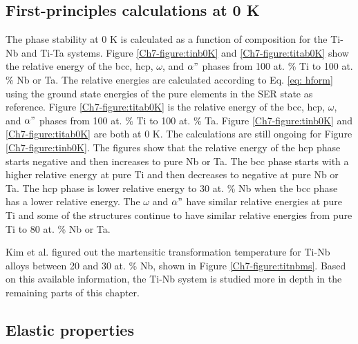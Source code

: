 \subsection{First-principles calculations at 0 K}

The phase stability at 0 K is calculated as a function of composition for the Ti-Nb and Ti-Ta systems. Figure \ref{Ch7-figure:tinb0K} and \ref{Ch7-figure:titab0K} show the relative energy of the bcc, hcp, $\omega$, and $\alpha"$ phases from 100 at. \% Ti to 100 at. \% Nb or Ta. The relative energies are calculated according to Eq. \ref{eq: hform} using the ground state energies of the pure elements in the SER state as reference. Figure \ref{Ch7-figure:titab0K} is the relative energy of the bcc, hcp, $\omega$, and $\alpha"$ phases from 100 at. \% Ti to 100 at. \% Ta. Figure \ref{Ch7-figure:tinb0K} and \ref{Ch7-figure:titab0K} are both at 0 K. The calculations are still ongoing for Figure \ref{Ch7-figure:tinb0K}. The figures show that the relative energy of the hcp phase starts negative and then increases to pure Nb or Ta. The bcc phase starts with a higher relative energy at pure Ti and then decreases to negative at pure Nb or Ta. The hcp phase is lower relative energy to 30 at. \% Nb when the bcc phase has a lower relative energy. The $\omega$ and $\alpha"$ have similar relative energies at pure Ti and some of the structures continue to have similar relative energies from pure Ti to 80 at. \% Nb or Ta.

Kim et al.  \cite{Kim2006} figured out the martensitic transformation temperature for Ti-Nb alloys between 20 and 30 at. \% Nb, shown in Figure \ref{Ch7-figure:titnbms}. Based on this available information, the Ti-Nb system is studied more in depth in the remaining parts of this chapter. 

\subsection{Elastic properties}

